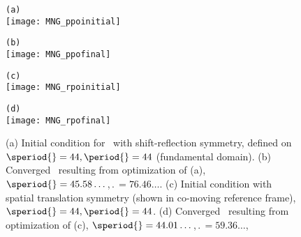 \begin{figure}
\begin{minipage}[height=.05\textheight]{.5\textwidth}
\centering
\small{\texttt{(a)}} \\
\texttt{[image: MNG\_ppoinitial]}
\end{minipage}
\begin{minipage}[height=.2\textheight]{.5\textwidth}
\centering
\small{\texttt{(b)}} \\
\texttt{[image: MNG\_ppofinal]}
\end{minipage}
\begin{minipage}[height=.2\textheight]{.5\textwidth}
\centering
\small{\texttt{(c)}} \\
\texttt{[image: MNG\_rpoinitial]}
\end{minipage}
\begin{minipage}[height=.2\textheight]{.5\textwidth}
\centering
\small{\texttt{(d)}} \\
\texttt{[image: MNG\_rpofinal]}
\end{minipage}
\caption{ \label{fig:KStrawl}
(a) Initial condition for \twot\ with shift-reflection symmetry, defined on
$\speriod{}=44,\period{}=44$ (fundamental domain). (b) Converged \twot\
resulting from optimization of (a), $\speriod{}= 45.58\dots$,$\period{}= 76.46\dots$.
(c) Initial condition with spatial translation symmetry (shown in co-moving reference frame),
$\speriod{}=44,\period{}=44$. (d) Converged \twot\ resulting from optimization
of (c), $\speriod{} = 44.01\dots$,$\period{}=59.36\dots$,}
\end{figure}

